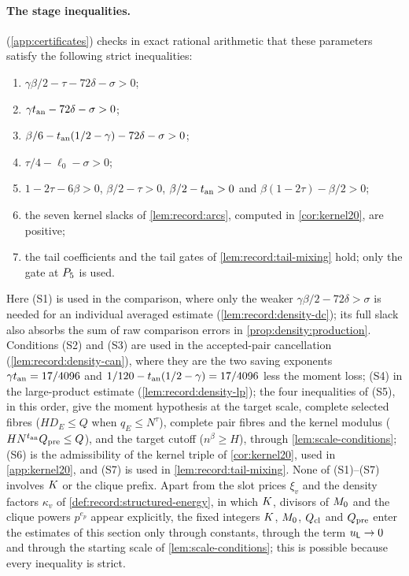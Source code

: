 \paragraph{The stage inequalities.}
 (\cref{app:certificates}) checks in
exact rational arithmetic that these parameters satisfy the following strict
inequalities:
\begin{enumerate}[label=(S\arabic*)]
\item $\gamma\beta/2-\tau-72\delta-\sigma>0$;
\item $\gamma t_{\rm an}-72\delta-\sigma>0$;
\item $\beta/6-t_{\rm an}(1/2-\gamma)-72\delta-\sigma>0$;
\item $\tau/4-\ell_0-\sigma>0$;
\item $1-2\tau-6\beta>0$, $\beta/2-\tau>0$, $\beta/2-t_{\rm an}>0$ and
 $\beta(1-2\tau)-\beta/2>0$;
\item the seven kernel slacks of \cref{lem:record:arcs}, computed in
 \cref{cor:kernel20}, are positive;
\item the tail coefficients and the tail gates of
 \cref{lem:record:tail-mixing} hold; only the gate at $P_5$ is used.
\end{enumerate}
Here (S1) is used in the comparison, where only the weaker
$\gamma\beta/2-72\delta>\sigma$ is needed for an individual averaged estimate
(\cref{lem:record:density-dc}); its full slack also absorbs the sum of raw
comparison errors in \cref{prop:density:production}. Conditions (S2) and (S3) are used in the accepted-pair
cancellation (\cref{lem:record:density-can}), where they are the two saving
exponents $\gamma t_{\rm an}=17/4096$ and
$1/120-t_{\rm an}(1/2-\gamma)=17/4096$ less the moment loss; (S4) in the
large-product estimate (\cref{lem:record:density-lp}); the four inequalities
of (S5), in this order, give the moment hypothesis at the target scale,
complete selected fibres ($HD_E\le Q$ when $q_E\le N^\tau$), complete pair
fibres and the kernel modulus ($HN^{t_{\rm an}}Q_{\rm pre}\le Q$), and the
target cutoff ($n^\beta\ge H$), through \cref{lem:scale-conditions}; (S6) is
the admissibility of the kernel triple of \cref{cor:kernel20}, used in
\cref{app:kernel20}, and (S7) is used in \cref{lem:record:tail-mixing}. None
of (S1)--(S7) involves $K$ or the clique prefix. Apart from the slot
prices $\xi_v$ and the density factors $\kappa_v$ of
\cref{def:record:structured-energy}, in which $K$, divisors of $M_0$
and the clique powers $p^{e_p}$ appear explicitly, the fixed integers
$K$, $M_0$, $Q_{\rm cl}$ and $Q_{\rm pre}$ enter the estimates of this
section only through constants, through the term $u_\mathsf L\to0$ and through the
starting scale of \cref{lem:scale-conditions}; this is possible because every
inequality is strict.

